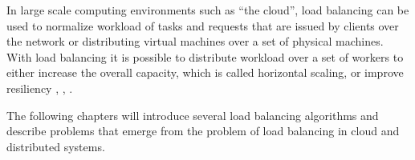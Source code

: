 In large scale computing environments such as ``the cloud'', load balancing can
be used to normalize workload of tasks and requests that are issued by
clients over the network \cite{alakeel2010guide} or distributing virtual machines
over a set of physical machines.
With load balancing it is possible to distribute workload over a set of workers
to either increase the overall capacity, which is called horizontal scaling,
or improve resiliency \cite{areYouLoadBalancingWrong}, \cite{aTaxonomyAndSurv},
\cite{cloudLBTech}.

The following chapters will introduce several load balancing algorithms and
describe problems that emerge from the problem of load balancing in cloud and
distributed systems.

